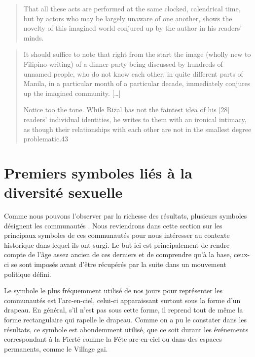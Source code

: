 \begin{quote}
  That all these acts are performed at the same clocked, calendrical time, but by actors who may be largely unaware of one another, shows the novelty of this imagined world conjured up by the author in his readers’ minds.
  \citep[26]{Anderson1983}
\end{quote}

\begin{quote}

  It should suffice to note that right from the start the image (wholly new to Filipino writing) of a dinner-party being discussed by hundreds of unnamed people, who do not know each other, in quite different parts of Manila, in a particular month of a particular decade, immediately conjures up the imagined community.
  [\ldots]

  Notice too the tone.
  While Rizal has not the faintest idea of his [28] readers’ individual identities, he writes to them with an ironical intimacy, as though their relationships with each other are not in the smallest degree problematic.43
\end{quote}
\section{Premiers symboles liés à la diversité sexuelle}
\label{sec:premiers_symboles_li_s_la_diversit_sexuelle}
Comme nous pouvons l'observer par la richesse des résultats, plusieurs symboles désignent les communautés \lgbt{}.
Nous reviendrons dans cette section sur les principaux symboles de ces communautés pour nous intéresser au contexte historique dans lequel ils ont surgi.
Le but ici est principalement de rendre compte de l'âge assez ancien de ces derniers et de comprendre qu'à la base, ceux-ci se sont imposés avant d'être récupérés par la suite dans un mouvement politique défini.

Le symbole le plus fréquemment utilisé de nos jours pour représenter les communautés \lgbt{} est l'arc-en-ciel, celui-ci apparaissant surtout sous la forme d'un drapeau.
En général, s'il n'est pas sous cette forme, il reprend tout de même la forme rectangulaire qui rapelle le drapeau.
Comme on a pu le constater dans les résultats, ce symbole est abondemment utilisé, que ce soit durant les événements correspondant à la Fierté comme la Fête arc-en-ciel ou dans des espaces permanents, comme le Village gai.

